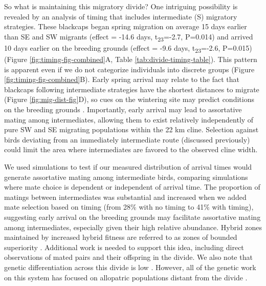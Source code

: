 \documentclass[a4paper, nobind]{templates/ociamthesis}
\begin{document}
So what is maintaining this migratory divide? One intriguing possibility is revealed by an analysis of timing that includes intermediate (S) migratory strategies. These blackcaps began spring migration on average 15 days earlier than SE and SW migrants (effect = -14.6 days, t\textsubscript{23}=-2.7, P=0.014) and arrived 10 days earlier on the breeding grounds (effect = -9.6 days, t\textsubscript{23}=-2.6, P=0.015) (Figure \ref{fig:timing-fig-combined}A, Table \ref{tab:divide-timing-table}). This pattern is apparent even if we do not categorize individuals into discrete groups (Figure \ref{fig:timing-fig-combined}B). Early spring arrival may relate to the fact that blackcaps following intermediate strategies have the shortest distances to migrate (Figure \ref{fig:mig-dist-fig}D), so cues on the wintering site may predict conditions on the breeding grounds \autocite{bothAvianPopulationConsequences2010,butlerDisproportionateEffectGlobal2003}. Importantly, early arrival may lead to assortative mating among intermediates, allowing them to exist relatively independently of pure SW and SE migrating populations within the 22 km cline. Selection against birds deviating from an immediately intermediate route (discussed previously) could limit the area where intermediates are favored to the observed cline width.

We used simulations to test if our measured distribution of arrival times would generate assortative mating among intermediate birds, comparing simulations where mate choice is dependent or independent of arrival time. The proportion of matings between intermediates was substantial and increased when we added mate selection based on timing (from 28\% with no timing to 41\% with timing), suggesting early arrival on the breeding grounds may facilitate assortative mating among intermediates, especially given their high relative abundance. Hybrid zones maintained by increased hybrid fitness are referred to as zones of bounded superiority \autocite{mooreEvaluationNarrowHybrid1977}. Additional work is needed to support this idea, including direct observations of mated pairs and their offspring in the divide. We also note that genetic differentiation across this divide is low \autocites{delmoreEvolutionaryHistoryGenomics2020}[also see][]{perez-trisHistoricalDiversificationMigration2004}{rolshausenContemporaryEvolutionReproductive2009}. However, all of the genetic work on this system has focused on allopatric populations distant from the divide \autocite{muellerIdentificationGeneAssociated2011,perez-trisHistoricalDiversificationMigration2004,rolshausenContemporaryEvolutionReproductive2009,rolshausenIndividualDifferencesMigratory2013}.
\end{document}

